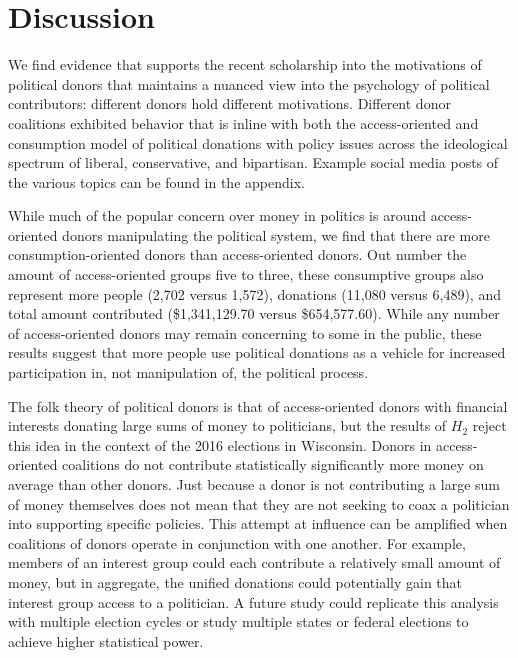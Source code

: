 \documentclass[12pt,]{article}
\begin{document}
\hypertarget{discussion}{%
\section{Discussion}\label{discussion}}

We find evidence that supports the recent scholarship into the
motivations of political donors that maintains a nuanced view into the
psychology of political contributors: different donors hold different
motivations. Different donor coalitions exhibited behavior that is
inline with both the access-oriented and consumption model of political
donations with policy issues across the ideological spectrum of liberal,
conservative, and bipartisan. Example social media posts of the various
topics can be found in the appendix.

While much of the popular concern over money in politics is around
access-oriented donors manipulating the political system, we find that
there are more consumption-oriented donors than access-oriented donors.
Out number the amount of access-oriented groups five to three, these
consumptive groups also represent more people (2,702 versus 1,572),
donations (11,080 versus 6,489), and total amount contributed
(\$1,341,129.70 versus \$654,577.60). While any number of
access-oriented donors may remain concerning to some in the public,
these results suggest that more people use political donations as a
vehicle for increased participation in, not manipulation of, the
political process.

The folk theory of political donors is that of access-oriented donors
with financial interests donating large sums of money to politicians,
but the results of \(H_{2}\) reject this idea in the context of the 2016
elections in Wisconsin. Donors in access-oriented coalitions do not
contribute statistically significantly more money on average than other
donors. Just because a donor is not contributing a large sum of money
themselves does not mean that they are not seeking to coax a politician
into supporting specific policies. This attempt at influence can be
amplified when coalitions of donors operate in conjunction with one
another. For example, members of an interest group could each contribute
a relatively small amount of money, but in aggregate, the unified
donations could potentially gain that interest group access to a
politician. A future study could replicate this analysis with multiple
election cycles or study multiple states or federal elections to achieve
higher statistical power.
\end{document}
